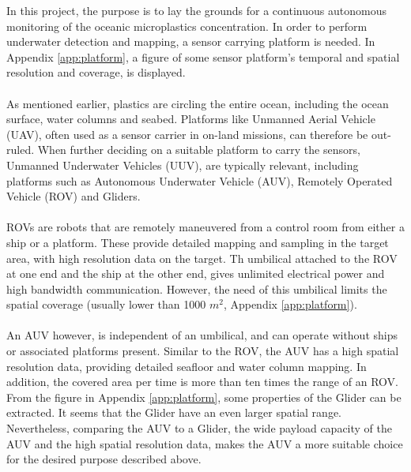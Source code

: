 In this project, the purpose is to lay the grounds for a continuous autonomous monitoring of the oceanic microplastics concentration. In order to perform underwater detection and mapping, a sensor carrying platform is needed. %
In Appendix \ref{app:platform}, a figure of some sensor platform's temporal and spatial resolution and coverage, is displayed.
\\\\
As mentioned earlier, plastics are circling the entire ocean, including the ocean surface, water columns and seabed. Platforms like Unmanned Aerial Vehicle (UAV), often used as a sensor carrier in on-land missions, can therefore be out-ruled. When further deciding on a suitable platform to carry the sensors, Unmanned Underwater Vehicles (UUV), are typically relevant, including platforms such as Autonomous Underwater Vehicle (AUV), Remotely Operated Vehicle (ROV) and Gliders.
\\\\
ROVs are robots that are remotely maneuvered from a control room from either a ship or a platform. These provide detailed mapping and sampling in the target area, with high resolution data on the target. Th umbilical attached to the ROV at one end and the ship at the other end, gives unlimited electrical power and high bandwidth communication. However, the need of this umbilical limits the spatial coverage (usually lower than 1000 $m^2$, Appendix \ref{app:platform}). 
\\\\
An AUV however, is independent of an umbilical, and can operate without ships or associated platforms present. Similar to the ROV, the AUV has a high spatial resolution data, providing detailed seafloor and water column mapping. In addition, the covered area per time is more than ten times the range of an ROV. From the figure in Appendix \ref{app:platform}, some properties of the Glider can be extracted. It seems that the Glider have an even larger spatial range. Nevertheless, comparing the AUV to a Glider, the wide payload capacity of the AUV and the high spatial resolution data, makes the AUV a more suitable choice for the desired purpose described above. 
